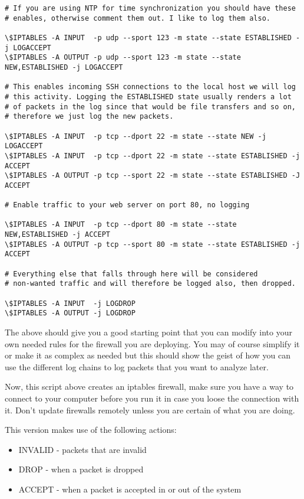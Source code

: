 \documentclass[english,twoside,openright,a4paper,12pt]{article}
\begin{document}
\begin{verbatim}
# If you are using NTP for time synchronization you should have these
# enables, otherwise comment them out. I like to log them also.

\$IPTABLES -A INPUT  -p udp --sport 123 -m state --state ESTABLISHED -j LOGACCEPT 
\$IPTABLES -A OUTPUT -p udp --sport 123 -m state --state NEW,ESTABLISHED -j LOGACCEPT

# This enables incoming SSH connections to the local host we will log
# this activity. Logging the ESTABLISHED state usually renders a lot
# of packets in the log since that would be file transfers and so on,
# therefore we just log the new packets.

\$IPTABLES -A INPUT  -p tcp --dport 22 -m state --state NEW -j LOGACCEPT
\$IPTABLES -A INPUT  -p tcp --dport 22 -m state --state ESTABLISHED -j ACCEPT 
\$IPTABLES -A OUTPUT -p tcp --sport 22 -m state --state ESTABLISHED -J ACCEPT

# Enable traffic to your web server on port 80, no logging

\$IPTABLES -A INPUT  -p tcp --dport 80 -m state --state NEW,ESTABLISHED -j ACCEPT 
\$IPTABLES -A OUTPUT -p tcp --sport 80 -m state --state ESTABLISHED -j ACCEPT

# Everything else that falls through here will be considered
# non-wanted traffic and will therefore be logged also, then dropped.

\$IPTABLES -A INPUT  -j LOGDROP
\$IPTABLES -A OUTPUT -j LOGDROP

\end{verbatim} 
\normalsize

The above should give you a good starting point that you can modify
 into your own needed rules for the firewall you are deploying. You
 may of course simplify it or make it as complex as needed but this
 should show the geist of how you can use the different log chains to
 log packets that you want to analyze later.

Now, this script above creates an iptables firewall, make sure you
have a way to connect to your computer before you run it in case you
loose the connection with it. Don't update firewalls remotely unless
you are certain of what you are doing.

This version makes use of the following actions:

\begin{itemize}
	\item INVALID - packets that are invalid
	\item DROP - when a packet is dropped
	\item ACCEPT - when a packet is accepted in or out of the system
\end{itemize}
\end{document}
